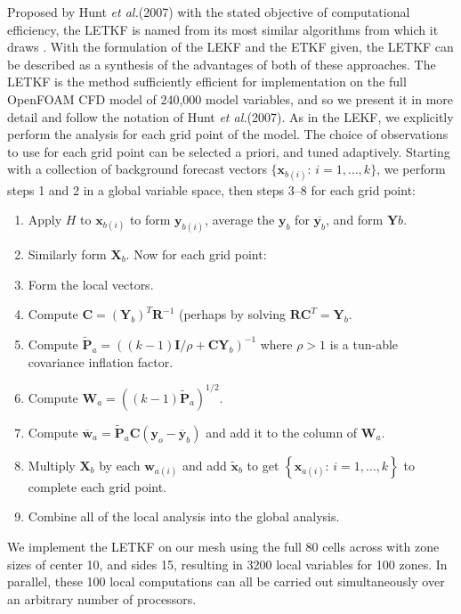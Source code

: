 \documentclass[10pt,letterpaper]{article}
\newcommand{\etal}{\textit{et al.}}
\newcommand{\mbx}{\mathbf{x}}
\newcommand{\mby}{\mathbf{y}}
\newcommand{\mbW}{\mathbf{W}}
\newcommand{\mbR}{\mathbf{R}}
\newcommand{\mbP}{\mathbf{P}}
\newcommand{\mbw}{\mathbf{w}}
\newcommand{\mbX}{\mathbf{X}}
\newcommand{\mbY}{\mathbf{Y}}
\begin{document}
Proposed by Hunt \etal (2007) with the stated objective of computational efficiency, the LETKF is named from its most similar algorithms from which it draws \cite{hunt2007efficient}.
With the formulation of the LEKF and the ETKF given, the LETKF can be  described as a synthesis of the advantages of both of these approaches.
The LETKF is the method sufficiently efficient for implementation on the full OpenFOAM CFD model of 240,000 model variables, and so we present it in more detail and follow the notation of Hunt \etal (2007). 
As in the LEKF, we explicitly perform the analysis for each grid point of the model.
The choice of observations to use for each grid point can be selected a priori, and tuned adaptively.
Starting with a collection of background forecast vectors $\{ \mbx_{b(i)}:\,i=1,\ldots,k \}$, we perform steps 1 and 2 in a global variable space, then steps 3--8 for each grid point:
\begin{enumerate}
\item Apply $H$ to $\mbx_{b(i)}$ to form $\mby_{b(i)}$, average the $\mby_b$ for $\overline{\mby_b}$, and form $\mbY b$.
\item Similarly form $\mbX_b$. Now for each grid point:
\item Form the local vectors.
\item Compute $\mathbf{C}=(\mbY_b)^T\mbR^{-1}$ (perhaps by solving $\mbR \mathbf{C}^T = \mbY_b$.
\item Compute $\tilde{\mbP}_a = \left( (k-1)\mathbf{I} / \rho + \mathbf{C} \mbY _b \right ) ^{-1}$ where $\rho > 1$ is a tun-able covariance inflation factor.
\item Compute $\mbW_a = \left ( (k-1) \tilde{\mbP} _a \right ) ^{1/2}$.
\item Compute $\overline{\mbw} _a  = \tilde{\mbP}_a \mathbf{C} \left ( \mby_o - \overline{\mby} _b \right )$ and add it to the column of $\mbW_a$.
\item Multiply $\mbX_b$ by each $\mbw_{a(i)}$ and add $\tilde{\mbx}_b$ to get $\left\{ \mbx_{a(i)}:\,i=1,\ldots,k\right \}$ to complete each grid point.
\item Combine all of the local analysis into the global analysis.
\end{enumerate}
We implement the LETKF on our mesh using the full 80 cells across with zone sizes of center 10, and sides 15, resulting in 3200 local variables for 100 zones.
In parallel, these 100 local computations can all be carried out simultaneously over an arbitrary number of processors.
\end{document}
